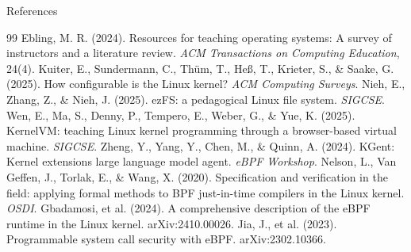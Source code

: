 \documentclass[aspectratio=169,10pt]{beamer}
\begin{document}
\begin{frame}{References}
  \scriptsize
  \begin{thebibliography}{99}
     Ebling, M. R. (2024). Resources for teaching operating systems: A survey of instructors and a literature review. \textit{ACM Transactions on Computing Education}, 24(4).
     Kuiter, E., Sundermann, C., Th\"um, T., He{\ss}, T., Krieter, S., \& Saake, G. (2025). How configurable is the Linux kernel? \textit{ACM Computing Surveys}.
     Nieh, E., Zhang, Z., \& Nieh, J. (2025). ezFS: a pedagogical Linux file system. \textit{SIGCSE}.
     Wen, E., Ma, S., Denny, P., Tempero, E., Weber, G., \& Yue, K. (2025). KernelVM: teaching Linux kernel programming through a browser-based virtual machine. \textit{SIGCSE}.
     Zheng, Y., Yang, Y., Chen, M., \& Quinn, A. (2024). KGent: Kernel extensions large language model agent. \textit{eBPF Workshop}.
     Nelson, L., Van Geffen, J., Torlak, E., \& Wang, X. (2020). Specification and verification in the field: applying formal methods to BPF just-in-time compilers in the Linux kernel. \textit{OSDI}.
     Gbadamosi, et al. (2024). A comprehensive description of the eBPF runtime in the Linux kernel. arXiv:2410.00026.
     Jia, J., et al. (2023). Programmable system call security with eBPF. arXiv:2302.10366.
  \end{thebibliography}
\end{frame}

\end{document}
